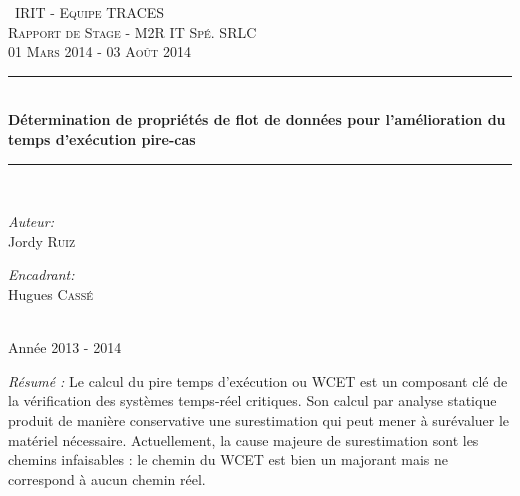 \documentclass[french]{article}
\begin{document}
  \begin{titlepage}
  \newcommand{\HRule}{\rule{\linewidth}{0.5mm}}
  \begin{center}
    \textsc{\	 IRIT - Equipe TRACES}\\[0.35cm]
    \textsc{\Large Rapport de Stage - M2R IT Spé. SRLC}\\[0.3cm]
    \textsc{\large 01 Mars 2014 - 03 Août 2014}
    \HRule \\[0.4cm]
    { \huge \bfseries Détermination de propriétés de flot de données pour l'amélioration du temps d'exécution
    pire-cas}
    \HRule \\[0.4cm]
    \begin{minipage}{0.5\textwidth} \begin{flushleft} \large \emph{Auteur:}\\ Jordy \textsc{Ruiz} \end{flushleft} \end{minipage}\begin{minipage}{0.5\textwidth} \begin{flushright} \large \emph{Encadrant:} \\ Hugues \textsc{Cassé}\end{flushright} \end{minipage}\\
    {\large Année 2013 - 2014}\\[0.5cm]
  \end{center}
    \vfill
  
  {\textit{Résumé :}
    Le calcul du pire temps d'exécution ou WCET est un composant 
    clé de la vérification des systèmes temps-réel critiques.
    Son calcul par analyse statique produit de manière conservative
    une surestimation qui peut mener à surévaluer le matériel nécessaire.
    Actuellement, la cause majeure de surestimation sont les chemins
    infaisables : le chemin du WCET est bien un majorant mais
    ne correspond à aucun chemin réel.
    
}
\end{titlepage}
\end{document}
